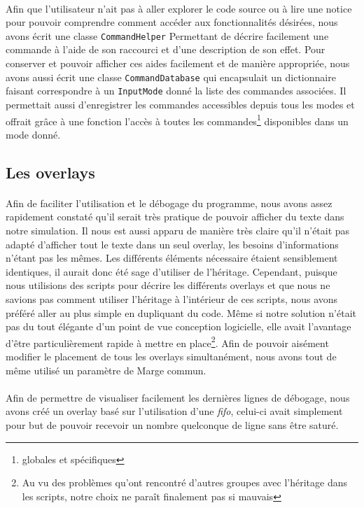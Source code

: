 \paragraph{}
Afin que l'utilisateur n'ait pas à aller explorer le code source ou à lire une
notice pour pouvoir comprendre comment accéder aux fonctionnalités désirées,
nous avons écrit une classe \verb!CommandHelper! Permettant de décrire
facilement une commande à l'aide de son raccourci et d'une description de son
effet. Pour conserver et pouvoir afficher ces aides facilement et de manière
appropriée, nous avons aussi écrit une classe \verb!CommandDatabase! qui
encapsulait un dictionnaire faisant correspondre à un \verb!InputMode! donné
la liste des commandes associées. Il permettait aussi d'enregistrer les
commandes accessibles depuis tous les modes et offrait grâce à une fonction
l'accès à toutes les commandes\footnote{globales et spécifiques} disponibles
dans un mode donné.

\subsection{Les overlays}
\paragraph{}
Afin de faciliter l'utilisation et le débogage du programme, nous avons assez
rapidement constaté qu'il serait très pratique de pouvoir afficher du texte
dans notre simulation. Il nous est aussi apparu de manière très claire qu'il
n'était pas adapté d'afficher tout le texte dans un seul overlay, les besoins
d'informations n'étant pas les mêmes. Les différents éléments nécessaire
étaient sensiblement identiques, il aurait donc été sage d'utiliser de
l'héritage. Cependant, puisque nous utilisions des scripts pour décrire les
différents overlays et que nous ne savions pas comment utiliser l'héritage à
l'intérieur de ces scripts, nous avons préféré aller au plus simple en
dupliquant du code. Même si notre solution n'était pas du tout élégante d'un
point de vue conception logicielle, elle avait l'avantage d'être
particulièrement rapide à mettre en place\footnote{Au vu des problèmes qu'ont
rencontré d'autres groupes avec l'héritage dans les scripts, notre choix ne
paraît finalement pas si mauvais}. Afin de pouvoir aisément modifier le
placement de tous les overlays simultanément, nous avons tout de même utilisé
un paramètre de Marge commun.

\paragraph{}
Afin de permettre de visualiser facilement les dernières lignes de débogage,
nous avons créé un overlay basé sur l'utilisation d'une {\em fifo}, celui-ci
avait simplement pour but de pouvoir recevoir un nombre quelconque de ligne
sans être saturé.

